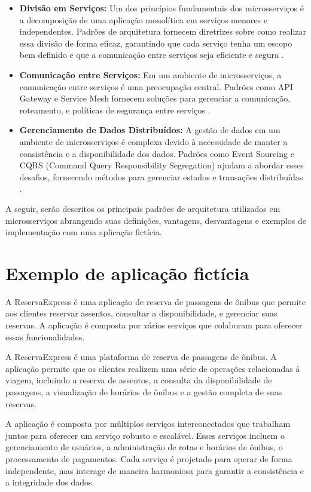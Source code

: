 \begin{itemize}
    \item \textbf{Divisão em Serviços:} Um dos princípios fundamentais dos microsserviços é a decomposição de uma aplicação monolítica em serviços menores e independentes. Padrões de arquitetura fornecem diretrizes sobre como realizar essa divisão de forma eficaz, garantindo que cada serviço tenha um escopo bem definido e que a comunicação entre serviços seja eficiente e segura \cite{newman2019}.
    
    \item \textbf{Comunicação entre Serviços:} Em um ambiente de microsserviços, a comunicação entre serviços é uma preocupação central. Padrões como API Gateway e Service Mesh fornecem soluções para gerenciar a comunicação, roteamento, e políticas de segurança entre serviços \cite{richardson2018}.
    
    \item \textbf{Gerenciamento de Dados Distribuídos:} A gestão de dados em um ambiente de microsserviços é complexa devido à necessidade de manter a consistência e a disponibilidade dos dados. Padrões como Event Sourcing e CQRS (Command Query Responsibility Segregation) ajudam a abordar esses desafios, fornecendo métodos para gerenciar estados e transações distribuídas \cite{newman2019}.
\end{itemize}

A seguir, serão descritos os principais padrões de arquitetura utilizados em microsserviços abrangendo suas definições, vantagens, desvantagens e exemplos de implementação com uma aplicação fictícia.

\section{Exemplo de aplicação fictícia}

A ReservaExpress é uma aplicação de reserva de passagens de ônibus que permite aos clientes reservar assentos, consultar a disponibilidade, e gerenciar suas reservas. A aplicação é composta por vários serviços que colaboram para oferecer essas funcionalidades.

A ReservaExpress é uma plataforma de reserva de passagens de ônibus. A aplicação permite que os clientes realizem uma série de operações relacionadas à viagem, incluindo a reserva de assentos, a consulta da disponibilidade de passagens, a visualização de horários de ônibus e a gestão completa de suas reservas.

A aplicação é composta por múltiplos serviços interconectados que trabalham juntos para oferecer um serviço robusto e escalável. Esses serviços incluem o gerenciamento de usuários, a administração de rotas e horários de ônibus, o processamento de pagamentos. Cada serviço é projetado para operar de forma independente, mas interage de maneira harmoniosa para garantir a consistência e a integridade dos dados.

